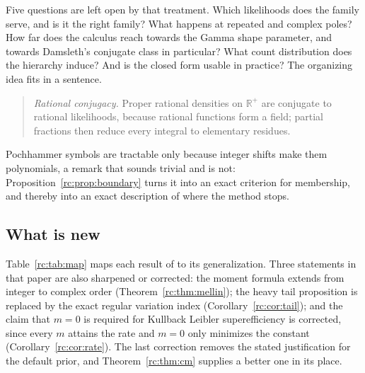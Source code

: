 Five questions are left open by that treatment. Which likelihoods does the family serve, and is it the right family? What happens at repeated and complex poles? How far does the calculus reach towards the Gamma shape parameter, and towards Damsleth's \citeyearpar{rc:damsleth1975} conjugate class in particular? What count distribution does the hierarchy induce? And is the closed form usable in practice? The organizing idea fits in a sentence.

\begin{quote}
\emph{Rational conjugacy.} Proper rational densities on $\mathbb{R}^+$ are conjugate to rational likelihoods, because rational functions form a field; partial fractions then reduce every integral to elementary residues.
\end{quote}

Pochhammer symbols are tractable only because integer shifts make them polynomials, a remark that sounds trivial and is not: Proposition~\ref{rc:prop:boundary} turns it into an exact criterion for membership, and thereby into an exact description of where the method stops.

\subsection*{What is new}

Table~\ref{rc:tab:map} maps each result of \citet{rc:wang2024} to its generalization. Three statements in that paper are also sharpened or corrected: the moment formula extends from integer to complex order (Theorem~\ref{rc:thm:mellin}); the heavy tail proposition is replaced by the exact regular variation index (Corollary~\ref{rc:cor:tail}); and the claim that $m=0$ is required for Kullback Leibler superefficiency is corrected, since every $m$ attains the rate and $m=0$ only minimizes the constant (Corollary~\ref{rc:cor:rate}). The last correction removes the stated justification for the default prior, and Theorem~\ref{rc:thm:cm} supplies a better one in its place.

